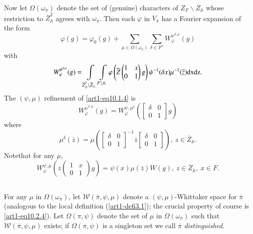 Now let $\Omega(\omega_{\overline{\pi}})$ denote the set of (genuine) characters of $Z_{F}\backslash \overline{Z}_{\mathbb{A}}$ whose restriction to $\overline{Z}^{2}_{\mathbb{A}}$ agrees with $\omega_{\overline{\pi}}$. Then each $\varphi$ in $V_{\overline{\pi}}$ has a Fourier expansion of the form
\setcounter{equation}{0}
\begin{equation}
\varphi(g)=\varphi_{0}(g)+\sum\limits_{\mu\in \Omega(\omega_{\overline{\pi}})}\sum\limits_{\delta\in F^{x}}W^{\psi^{\delta,\mu}}_{\varphi}(g)\label{art1-eq10.2.1}
\end{equation}
with
\begin{equation}
W^{\psi^{\delta,\mu}}_{\varphi}(g)=\int\limits_{\overline{Z}^{2}_{\mathbb{A}}\backslash \overline{Z}_{\mathbb{A}}}\int\limits_{F\backslash \mathbb{A}}\varphi\left(\overline{Z}\left(\begin{matrix} 1 & x\\ 0 & 1\end{matrix}\right)g\right)\psi^{-1}(\delta x)\mu^{-1}(\overline{z})\mathrm{dx}\mathrm{dz}.\label{art1-eq10.2.2}
\end{equation}
The $(\psi,\mu)$ refinement of \eqref{art1-eq10.1.4} is
\begin{equation}
W^{\psi^{\delta,\mu}}_{\varphi}(g)=W^{\psi,\mu^{\delta}}_{\varphi}\left(\begin{bmatrix}\delta & 0\\ 0 & 1\end{bmatrix}g\right)\label{art1-eq10.2.3}
\end{equation}
where
$$
\mu^{\delta}(\overline{z})=\mu\left(\begin{bmatrix} \delta & 0\\ 0 & 1\end{bmatrix}^{-1}\overline{z}\begin{bmatrix} \delta & 0\\ 0 & 1\end{bmatrix}\right), \ z\in \overline{Z}_{\mathbb{A}}.
$$
Note\pageoriginale that for any $\mu$,
\begin{equation}
W^{\psi,\mu}_{\varphi}\left(\overline{z}\left(\begin{matrix} 1 & x\\ 0 & 1\end{matrix}\right)g\right)=\psi(x)\mu(\overline{z})W(g), \ z\in\overline{Z}_{\mathbb{A}}, \ x\in F.\label{art1-eq10.2.4}
\end{equation}

\subsection{}\label{art1-sec10.3}
For any $\mu$ in $\Omega(\omega_{\overline{\pi}})$, let $\mathscr{W}(\overline{\pi},\psi,\mu)$ denote a $(\psi,\mu)$-Whittaker space for $\overline{\pi}$ (analogous to the local definition (\ref{art1-defi3.1}); the crucial property of course is \eqref{art1-eq10.2.4}). Let $\Omega(\pi,\psi)$ denote the set of $\mu$ in $\Omega(\omega_{\overline{\pi}})$ such that $\mathscr{W}(\overline{\pi},\psi,\mu)$ exists; if $\Omega(\pi,\psi)$ is a singleton set we call $\overline{\pi}$ {\em distinguished}.

